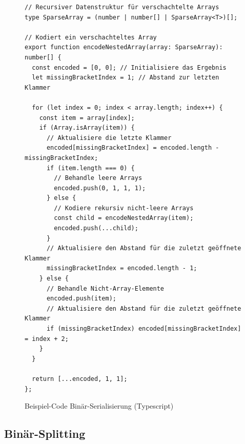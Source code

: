 \documentclass[ngerman]{article}
\begin{document}
\begin{figure}[htbp]
  \begin{code}
    \begin{verbatim}
// Recursiver Datenstruktur für verschachtelte Arrays
type SparseArray = (number | number[] | SparseArray<T>)[];

// Kodiert ein verschachteltes Array
export function encodeNestedArray(array: SparseArray): number[] {
  const encoded = [0, 0]; // Initialisiere das Ergebnis
  let missingBracketIndex = 1; // Abstand zur letzten Klammer

  for (let index = 0; index < array.length; index++) {
    const item = array[index];
    if (Array.isArray(item)) {
      // Aktualisiere die letzte Klammer
      encoded[missingBracketIndex] = encoded.length - missingBracketIndex;
      if (item.length === 0) {
        // Behandle leere Arrays
        encoded.push(0, 1, 1, 1);
      } else {
        // Kodiere rekursiv nicht-leere Arrays
        const child = encodeNestedArray(item);
        encoded.push(...child);
      }
      // Aktualisiere den Abstand für die zuletzt geöffnete Klammer
      missingBracketIndex = encoded.length - 1;
    } else {
      // Behandle Nicht-Array-Elemente
      encoded.push(item);
      // Aktualisiere den Abstand für die zuletzt geöffnete Klammer
      if (missingBracketIndex) encoded[missingBracketIndex] = index + 2;
    }
  }

  return [...encoded, 1, 1];
};
    \end{verbatim}
  \end{code}

  \caption{Beispiel-Code Binär-Serialisierung (Typescript)}
  \label{sec:data_nested_encoding}

\end{figure}

\pagebreak

\subsection{Binär-Splitting}
\label{sec:code_nested_splitting}
\end{document}
